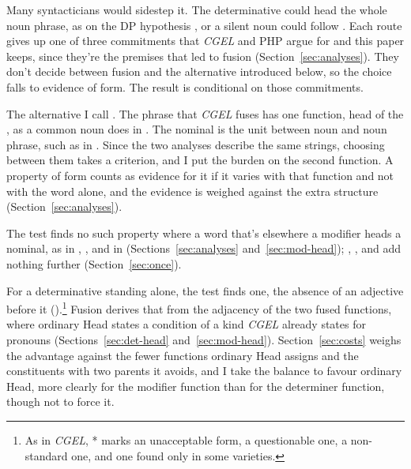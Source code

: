 Many syntacticians would sidestep it. The determinative could head the whole noun phrase, as on the DP hypothesis \citep[see][]{millerpullum2022tete}, or a silent noun could follow  \citep{lobeck1995ellipsis,kester1996adjectival}. Each route gives up one of three commitments that \textit{CGEL} and PHP argue for and this paper keeps, since they're the premises that led to fusion (Section~\ref{sec:analyses}). They don't decide between fusion and the alternative introduced below, so the choice falls to evidence of form. The result is conditional on those commitments.

The alternative I call . The phrase that \textit{CGEL} fuses has one function, head of the , as a common noun does in . The nominal is the unit between noun and noun phrase, such as  in . Since the two analyses describe the same strings, choosing between them takes a criterion, and I put the burden on the second function. A property of form counts as evidence for it if it varies with that function and not with the word alone, and the evidence is weighed against the extra structure (Section~\ref{sec:analyses}).

The test finds no such property where a word that's elsewhere a modifier heads a nominal, as in , , and  in  (Sections~\ref{sec:analyses} and~\ref{sec:mod-head}); , , and  add nothing further (Section~\ref{sec:once}).

For a determinative standing alone, the test finds one, the absence of an adjective before it ().\footnote{As in \textit{CGEL}, * marks an unacceptable form,  a questionable one, \judgmark{!} a non-standard one, and \judgmark{\%} one found only in some varieties.} Fusion derives that from the adjacency of the two fused functions, where ordinary Head states a condition of a kind \textit{CGEL} already states for pronouns (Sections~\ref{sec:det-head} and~\ref{sec:mod-head}). Section~\ref{sec:costs} weighs the advantage against the fewer functions ordinary Head assigns and the constituents with two parents it avoids, and I take the balance to favour ordinary Head, more clearly for the modifier function than for the determiner function, though not to force it.

